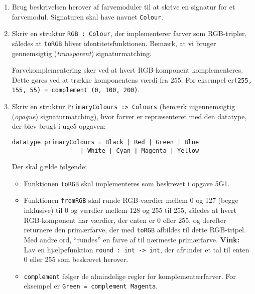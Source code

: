 \documentclass[a4paper,12pt]{article}
\begin{document}
\begin{enumerate}[{7}M1]

\item Brug beskrivelsen herover af farvemoduler til at skrive en
  signatur for et farvemodul.  Signaturen skal have navnet
  \lstinline{Colour}.

\item Skriv en struktur \lstinline{RGB : Colour}, der implementerer
  farver som RGB-tripler, således at \lstinline{toRGB} bliver
  identitetsfunktionen.  Bemærk, at vi bruger gennemsigtig
  (\emph{transparent}) signaturmatching.

  Farvekomplementering sker ved at hvert RGB-komponent komplementeres.
  Dette gøres ved at trække komponentens værdi fra 255.  For eksempel
  er\newline \lstinline{(255, 155, 55) = complement (0, 100, 200)}.

\item Skriv en struktur \lstinline{PrimaryColours :> Colours} (bemærk
  uigennemsigtig (\emph{opaque}) signaturmatching), hvor farver er
  repræsenteret med den datatype, der blev brugt i uge5-opgaven:

\begin{lstlisting}
datatype primaryColours = Black | Red | Green | Blue
                   | White | Cyan | Magenta | Yellow
\end{lstlisting}

Der skal gælde følgende:

\begin{itemize}
\item Funktionen \lstinline{toRGB} skal implementeres som beskrevet i opgave 5G1.

\item Funktionen \lstinline{fromRGB} skal runde RGB-værdier mellem 0
  og 127 (begge inklusive) til 0 og værdier mellem 128 og 255 til 255,
  således at hvert RGB-komponent har værdier, der enten er 0 eller
  255, og derefter returnere den primærfarve, der med
  \lstinline{toRGB} afbildes til dette RGB-tripel.  Med andre ord,
  ``rundes'' en farve af til nærmeste primærfarve.  \textbf{Vink:} Lav
  en hjælpefunktion \lstinline{round : int -> int}, der afrunder et
  tal til enten 0 eller 255 som beskrevet herover.

\item \lstinline{complement} følger de almindelige regler for
  komplementærfarver.  For eksempel er \lstinline{Green = complement Magenta}.

\end{itemize}


\end{enumerate}
\end{document}
